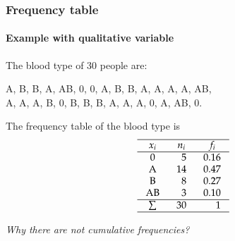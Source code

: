 \begin{frame}
\frametitle{Frequency table}
\framesubtitle{Example with qualitative variable}
The blood type of 30 people are:
\begin{center}
A, B, B, A, AB, 0, 0, A, B, B, A, A, A, A, AB,\\
A, A, A, B, 0, B, B, B, A, A, A, 0, A, AB, 0.
\end{center}
The frequency table of the blood type is 
\[
\setlength\arraycolsep{3mm}
\setlength\arrayrulewidth{0.5pt}
\begin{array}{crr}
\hline
\multicolumn{1}{c}{x_i} & \multicolumn{1}{c}{n_i} & \multicolumn{1}{c}{f_i} \\
\hline
\mbox{0} & 5 & 0.16 \\
\mbox{A} & 14 & 0.47 \\
\mbox{B} & 8 & 0.27 \\
\mbox{AB} & 3 & 0.10 \\
\hline
\sum & 30 & 1 \\
\hline
\end{array}
\]
\begin{center}
\emph{Why there are not cumulative frequencies?}
\end{center}
\end{frame}

